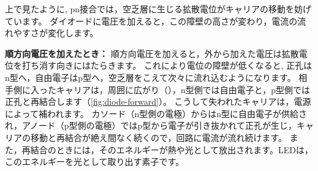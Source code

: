 \begin{column}
上で見たように, pn接合では，空乏層に生じる拡散電位がキャリアの移動を妨げています。
ダイオードに電圧を加えると，この障壁の高さが変わり，電流の流れやすさが変化します。

\textbf{順方向電圧を加えたとき：}\quad
順方向電圧を加えると，外から加えた電圧は拡散電位を打ち消す向きにはたらきます。
これにより電位の障壁が低くなると, 正孔はn型へ，自由電子はp型へ，空乏層をこえて次々に流れ込むようになります。
相手側に入ったキャリアは，周囲に広がり（），n型側では自由電子と，p型側では正孔と再結合します（\cref{fig:diode-forward}）。
こうして失われたキャリアは，電源によって補われます。
カソード（n型側の電極）からはn型に自由電子が供給され，アノード（p型側の電極）ではp型から電子が引き抜かれて正孔が生じ，キャリアの移動と再結合が絶え間なく続くので，回路に電流が流れ続けます。
また，再結合のときには，そのエネルギーが熱や光として放出されます。LEDは，このエネルギーを光として取り出す素子です。


\end{column}
